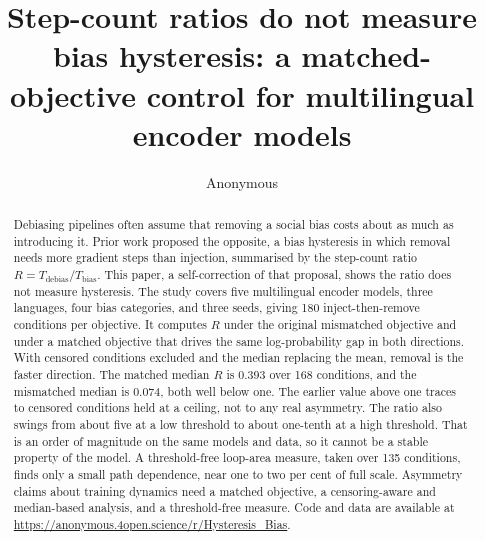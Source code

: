 \documentclass[Afour,sageh,times]{sagej}
\begin{document}

\title{Step-count ratios do not measure bias hysteresis: a matched-objective control for multilingual encoder models}

\author{Anonymous}

\affiliation{}

\begin{abstract}
Debiasing pipelines often assume that removing a social bias costs about as much as introducing it. Prior work proposed the opposite, a bias hysteresis in which removal needs more gradient steps than injection, summarised by the step-count ratio $R = T_{\mathrm{debias}}/T_{\mathrm{bias}}$. This paper, a self-correction of that proposal, shows the ratio does not measure hysteresis. The study covers five multilingual encoder models, three languages, four bias categories, and three seeds, giving 180 inject-then-remove conditions per objective. It computes $R$ under the original mismatched objective and under a matched objective that drives the same log-probability gap in both directions. With censored conditions excluded and the median replacing the mean, removal is the faster direction. The matched median $R$ is 0.393 over 168 conditions, and the mismatched median is 0.074, both well below one. The earlier value above one traces to censored conditions held at a ceiling, not to any real asymmetry. The ratio also swings from about five at a low threshold to about one-tenth at a high threshold. That is an order of magnitude on the same models and data, so it cannot be a stable property of the model. A threshold-free loop-area measure, taken over 135 conditions, finds only a small path dependence, near one to two per cent of full scale. Asymmetry claims about training dynamics need a matched objective, a censoring-aware and median-based analysis, and a threshold-free measure. Code and data are available at \url{https://anonymous.4open.science/r/Hysteresis_Bias}.
\end{abstract}


\maketitle
\end{document}

